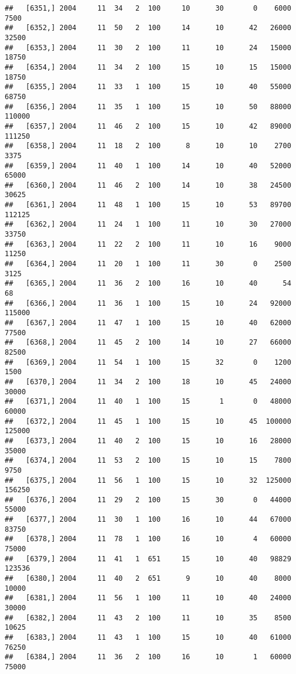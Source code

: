 \documentclass{article}\usepackage[]{graphicx}\usepackage[]{color}
\makeatletter
\newenvironment{kframe}{%
 \def\at@end@of@kframe{}%
 \ifinner\ifhmode%
  \def\at@end@of@kframe{\end{minipage}}%
  \begin{minipage}{\columnwidth}%
 \fi\fi%
 \def\FrameCommand##1{\hskip\@totalleftmargin \hskip-\fboxsep
 \colorbox{shadecolor}{##1}\hskip-\fboxsep
     \hskip-\linewidth \hskip-\@totalleftmargin \hskip\columnwidth}%
 \MakeFramed {\advance\hsize-\width
   \@totalleftmargin\z@ \linewidth\hsize
   \@setminipage}}%
 {\par\unskip\endMakeFramed%
 \at@end@of@kframe}
\newenvironment{knitrout}{}{} %
\makeatother
\begin{document}
\begin{knitrout}
\begin{kframe}
\begin{verbatim}
##   [6351,] 2004     11  34   2  100     10      30       0    6000    7500
##   [6352,] 2004     11  50   2  100     14      10      42   26000   32500
##   [6353,] 2004     11  30   2  100     11      10      24   15000   18750
##   [6354,] 2004     11  34   2  100     15      10      15   15000   18750
##   [6355,] 2004     11  33   1  100     15      10      40   55000   68750
##   [6356,] 2004     11  35   1  100     15      10      50   88000  110000
##   [6357,] 2004     11  46   2  100     15      10      42   89000  111250
##   [6358,] 2004     11  18   2  100      8      10      10    2700    3375
##   [6359,] 2004     11  40   1  100     14      10      40   52000   65000
##   [6360,] 2004     11  46   2  100     14      10      38   24500   30625
##   [6361,] 2004     11  48   1  100     15      10      53   89700  112125
##   [6362,] 2004     11  24   1  100     11      10      30   27000   33750
##   [6363,] 2004     11  22   2  100     11      10      16    9000   11250
##   [6364,] 2004     11  20   1  100     11      30       0    2500    3125
##   [6365,] 2004     11  36   2  100     16      10      40      54      68
##   [6366,] 2004     11  36   1  100     15      10      24   92000  115000
##   [6367,] 2004     11  47   1  100     15      10      40   62000   77500
##   [6368,] 2004     11  45   2  100     14      10      27   66000   82500
##   [6369,] 2004     11  54   1  100     15      32       0    1200    1500
##   [6370,] 2004     11  34   2  100     18      10      45   24000   30000
##   [6371,] 2004     11  40   1  100     15       1       0   48000   60000
##   [6372,] 2004     11  45   1  100     15      10      45  100000  125000
##   [6373,] 2004     11  40   2  100     15      10      16   28000   35000
##   [6374,] 2004     11  53   2  100     15      10      15    7800    9750
##   [6375,] 2004     11  56   1  100     15      10      32  125000  156250
##   [6376,] 2004     11  29   2  100     15      30       0   44000   55000
##   [6377,] 2004     11  30   1  100     16      10      44   67000   83750
##   [6378,] 2004     11  78   1  100     16      10       4   60000   75000
##   [6379,] 2004     11  41   1  651     15      10      40   98829  123536
##   [6380,] 2004     11  40   2  651      9      10      40    8000   10000
##   [6381,] 2004     11  56   1  100     11      10      40   24000   30000
##   [6382,] 2004     11  43   2  100     11      10      35    8500   10625
##   [6383,] 2004     11  43   1  100     15      10      40   61000   76250
##   [6384,] 2004     11  36   2  100     16      10       1   60000   75000

\end{verbatim}
\end{kframe}
\end{knitrout}
\end{document}
